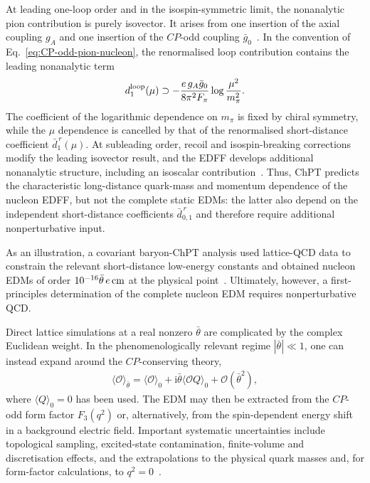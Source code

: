 \documentclass[review]{elsarticle}
\numberwithin{equation}{section}
\numberwithin{table}{section}
\numberwithin{figure}{section}
\def\i{\mathrm{i}}
\begin{document}
At leading one-loop order and in the isospin-symmetric limit, the nonanalytic pion contribution is purely isovector. It arises from one insertion of the axial coupling $g_A$ and one insertion of the $CP$-odd coupling $\bar g_0$~\cite{Crewther:1979pi,Hockings:2005cn,Mereghetti:2010kp}. In the convention of Eq.~\eqref{eq:CP-odd-pion-nucleon}, the renormalised loop contribution contains the leading nonanalytic term
\begin{align}
    d_1^{\rm loop}(\mu)
    \supset
    -\frac{e\,g_A\bar g_0}{8\pi^2F_\pi}
    \log\frac{\mu^2}{m_\pi^2}.
    \label{eq:edm-chiral-log}
\end{align}
The coefficient of the logarithmic dependence on $m_\pi$ is fixed by chiral symmetry, while the $\mu$ dependence is cancelled by that of the renormalised short-distance coefficient $\bar d_1^{\,r}(\mu)$. At subleading order, recoil and isospin-breaking corrections modify the leading isovector result, and the EDFF develops additional nonanalytic structure, including an isoscalar contribution~\cite{Ottnad:2009jw,Mereghetti:2010kp}. Thus, ChPT predicts the characteristic long-distance quark-mass and momentum dependence of the nucleon EDFF, but not the complete static EDMs: the latter also depend on the independent short-distance coefficients $\bar d_{0,1}^{\,r}$ and therefore require additional nonperturbative input.

As an illustration, a covariant baryon-ChPT analysis used lattice-QCD data to constrain the relevant short-distance low-energy constants and obtained nucleon EDMs of order $10^{-16}\bar\theta\,e\,{\rm cm}$ at the physical point~\cite{Guo:2012vf}. Ultimately, however, a first-principles determination of the complete nucleon EDM requires nonperturbative QCD.

Direct lattice simulations at a real nonzero $\bar\theta$ are complicated by the complex Euclidean weight. In the phenomenologically relevant regime $|\bar\theta|\ll1$, one can instead expand around the $CP$-conserving theory,
\begin{align}
    \langle\mathcal{O}\rangle_{\bar\theta}
    =
    \langle\mathcal{O}\rangle_{0}
    +
    \i\bar\theta
    \langle\mathcal{O}Q\rangle_{0}
    +
    \mathcal{O}(\bar\theta^2),
    \label{eq:lattice-small-theta}
\end{align}
where $\langle Q\rangle_0=0$ has been used. The EDM may then be extracted from the $CP$-odd form factor $F_3(q^2)$ or, alternatively, from the spin-dependent energy shift in a background electric field. Important systematic uncertainties include topological sampling, excited-state contamination, finite-volume and discretisation effects, and the extrapolations to the physical quark masses and, for form-factor calculations, to $q^2=0$~\cite{Liu:2024kqy}.
\end{document}
